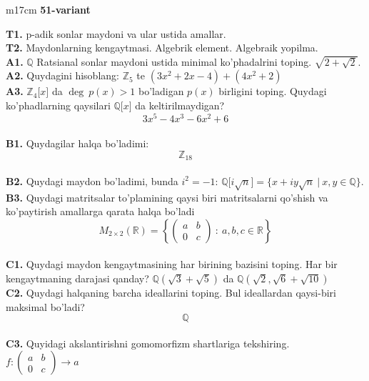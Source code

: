\documentclass{article}
\begin{document}
\begin{tabular}{m{17cm}}
\textbf{51-variant}
\newline

\textbf{T1.} p-adik sonlar maydoni va ular ustida amallar. \\
\textbf{T2.} Maydonlarning kengaytmasi. Algebrik element. Algebraik yopilma. \\
\textbf{A1.} \(\mathbb{Q}\) Ratsianal sonlar maydoni ustida minimal ko'phadalrini toping.
\(\sqrt{2 + \sqrt{2}}\). \\
\textbf{A2.} Quydagini hisoblang:
\(\mathbb{Z}_{5}\) te \(\left( 3x^{2} + 2x - 4 \right) + \left( 4x^{2} + 2 \right)\) \\
\textbf{A3.} \(\mathbb{Z}_{4}\lbrack x\rbrack\) da \(\deg\ p(x) > 1\) bo'ladigan \(p(x)\) birligini toping. Quydagi ko'phadlarning qaysilari \(\mathbb{Q\lbrack}x\rbrack\) da keltirilmaydigan?
\[3x^{5} - 4x^{3} - 6x^{2} + 6\] \\
\textbf{B1.} Quydagilar halqa bo'ladimi:
\[\mathbb{Z}_{18}\] \\
\textbf{B2.} Quydagi maydon bo'ladimi, bunda \(i^{2} = - 1\):
\(\mathbb{Q\lbrack}i\sqrt{n}\rbrack = \{ x + iy\sqrt{n}\ |\ x,y \in \mathbb{Q\}}\). \\
\textbf{B3.} Quydagi matritsalar to'plamining qaysi biri matritsalarni qo'shish va ko'paytirish amallarga qarata halqa bo'ladi
\[M_{2 \times 2}\mathbb{(R) =}\left\{ \begin{pmatrix}
a & b \\
0 & c
\end{pmatrix}\ :\ a,b,c \in \mathbb{R} \right\}\] \\
\textbf{C1.} Quydagi maydon kengaytmasining har birining bazisini toping. Har bir kengaytmaning darajasi qanday?
\(\mathbb{Q}\left( \sqrt{3} + \sqrt{5} \right)\) da \(\mathbb{Q}\left( \sqrt{2},\sqrt{6} + \sqrt{10} \right)\) \\
\textbf{C2.} Quydagi halqaning barcha ideallarini toping. Bul ideallardan qaysi-biri maksimal bo'ladi?
\[\mathbb{Q}\] \\
\textbf{C3.} Quyidagi akslantirishni gomomorfizm shartlariga tekshiring. \(f:\begin{pmatrix}
a & b \\
0 & c
\end{pmatrix} \rightarrow a\) \\

\end{tabular}
\vspace{1cm}
\end{document}
